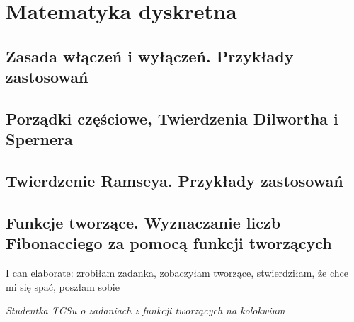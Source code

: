 {
\makeatletter
{}
\makeatother
\graphicspath{{../dyskretna}}

\let\realsection\section
\let\realsubsection\subsection
\let\section\subsection
\let\subsection\subsubsection
\let\subsubsection\paragraph

\chapter{Matematyka dyskretna}


\realsection{Zasada włączeń i wyłączeń. Przykłady zastosowań}


\realsection{Porządki częściowe, Twierdzenia Dilwortha i Spernera}


\realsection{Twierdzenie Ramseya. Przykłady zastosowań}


\realsection{Funkcje tworzące. Wyznaczanie liczb Fibonacciego za pomocą funkcji tworzących}

\epigraph{I can elaborate: zrobiłam zadanka, zobaczyłam tworzące, stwierdziłam, że chce mi się spać, poszłam sobie}{\textit{Studentka TCSu o zadaniach z funkcji tworzących na kolokwium}}


}
